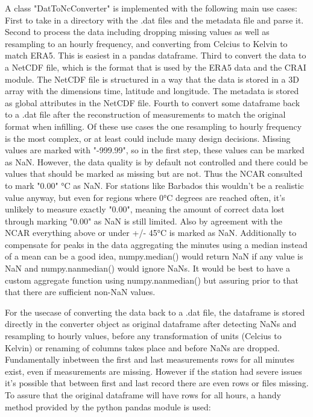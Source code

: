 A class "DatToNcConverter" is implemented with the following main use cases:
First to take in a directory with the .dat files and the metadata file and parse it. Second to process the data including dropping missing values as well as resampling to an hourly frequency, and converting from Celcius to Kelvin to match ERA5. This is easiest in a pandas dataframe. Third to convert the data to a NetCDF file, which is the format that is used by the ERA5 data and the CRAI module. The NetCDF file is structured in a way that the data is stored in a 3D array with the dimensions time, latitude and longitude. The metadata is stored as global attributes in the NetCDF file. Fourth to convert some dataframe back to a .dat file after the reconstruction of measurements to match the original format when infilling. Of these use cases the one resampling to hourly frequency is the most complex, or at least could include many design decisions. Missing values are marked with "-999.99", so in the first step, these values can be marked as NaN. However, the data quality is by default not controlled and there could be values that should be marked as missing but are not. Thus the NCAR consulted to mark "0.00" °C as NaN. For stations like Barbados this wouldn't be a realistic value anyway, but even for regions where 0°C degrees are reached often, it's unlikely to measure exactly "0.00", meaning the amount of correct data lost through marking "0.00" as NaN is still limited. Also by agreement with the NCAR everything above or under +/- 45°C is marked as NaN. Additionally to compensate for peaks in the data aggregating the minutes using a median instead of a mean can be a good idea, numpy.median() would return NaN if any value is NaN and numpy.nanmedian() would ignore NaNs. It would be best to have a custom aggregate function using numpy.nanmedian() but assuring prior to that that there are sufficient non-NaN values.

For the usecase of converting the data back to a .dat file, the dataframe is stored directly in the converter object as original dataframe after detecting NaNs and resampling to hourly values, before any transformation of units (Celcius to Kelvin) or renaming of columns takes place and before NaNs are dropped. Fundamentally inbetween the first and last measurements rows for all minutes exist, even if measurements are missing. However if the station had severe issues it's possible that between first and last record there are even rows or files missing. To assure that the original dataframe will have rows for all hours, a handy method provided by the python pandas module is used:

